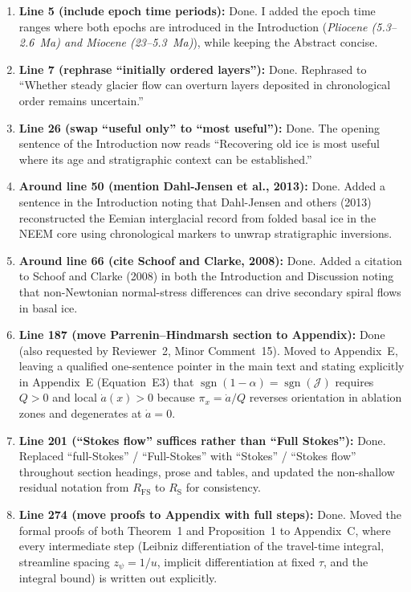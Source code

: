 \documentclass[11pt]{article}
\begin{document}
\begin{enumerate}
  \item \textbf{Line 5 (include epoch time periods):} \textcolor{responseblue}{Done. I added the epoch time ranges where both epochs are introduced in the Introduction (\emph{Pliocene (5.3--2.6~Ma) and Miocene (23--5.3~Ma)}), while keeping the Abstract concise.}
  \item \textbf{Line 7 (rephrase ``initially ordered layers''):} \textcolor{responseblue}{Done. Rephrased to ``Whether steady glacier flow can overturn layers deposited in chronological order remains uncertain.''}
  \item \textbf{Line 26 (swap ``useful only'' to ``most useful''):} \textcolor{responseblue}{Done. The opening sentence of the Introduction now reads ``Recovering old ice is most useful where its age and stratigraphic context can be established.''}
  \item \textbf{Around line 50 (mention Dahl-Jensen et al., 2013):} \textcolor{responseblue}{Done. Added a sentence in the Introduction noting that Dahl-Jensen and others (2013) reconstructed the Eemian interglacial record from folded basal ice in the NEEM core using chronological markers to unwrap stratigraphic inversions.}
  \item \textbf{Around line 66 (cite Schoof and Clarke, 2008):} \textcolor{responseblue}{Done. Added a citation to Schoof and Clarke (2008) in both the Introduction and Discussion noting that non-Newtonian normal-stress differences can drive secondary spiral flows in basal ice.}
  \item \textbf{Line 187 (move Parrenin--Hindmarsh section to Appendix):} \textcolor{responseblue}{Done (also requested by Reviewer~2, Minor Comment~15). Moved to Appendix~E, leaving a qualified one-sentence pointer in the main text and stating explicitly in Appendix~E (Equation~E3) that \(\operatorname{sgn}(1-\alpha)=\operatorname{sgn}(\mathcal{J})\) requires \(Q>0\) and local \(\dot a(x)>0\) because \(\pi_x=\dot a/Q\) reverses orientation in ablation zones and degenerates at \(\dot a=0\).}
  \item \textbf{Line 201 (``Stokes flow'' suffices rather than ``Full Stokes''):} \textcolor{responseblue}{Done. Replaced ``full-Stokes'' / ``Full-Stokes'' with ``Stokes'' / ``Stokes flow'' throughout section headings, prose and tables, and updated the non-shallow residual notation from \(R_{\mathrm{FS}}\) to \(R_{\mathrm{S}}\) for consistency.}
  \item \textbf{Line 274 (move proofs to Appendix with full steps):} \textcolor{responseblue}{Done. Moved the formal proofs of both Theorem~1 and Proposition~1 to Appendix~C, where every intermediate step (Leibniz differentiation of the travel-time integral, streamline spacing \(z_\psi=1/u\), implicit differentiation at fixed \(\tau\), and the integral bound) is written out explicitly.}

\end{enumerate}
\end{document}
